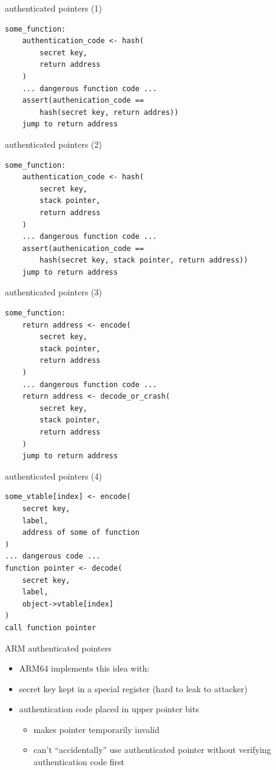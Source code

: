 \begin{frame}[fragile,label=authPtr1]{authenticated pointers (1)}
\begin{lstlisting}[language={},style=smaller]
some_function:
    authentication_code <- hash(
        secret key, 
        return address
    )
    ... dangerous function code ...
    assert(authenication_code ==
        hash(secret key, return addres))
    jump to return address
\end{lstlisting}
\end{frame}

\begin{frame}[fragile,label=authPtr2]{authenticated pointers (2)}
\begin{lstlisting}[language={},style=smaller]
some_function:
    authentication_code <- hash(
        secret key,
        stack pointer, 
        return address
    )
    ... dangerous function code ...
    assert(authenication_code ==
        hash(secret key, stack pointer, return address))
    jump to return address
\end{lstlisting}
\end{frame}


\begin{frame}[fragile,label=authPtr3]{authenticated pointers (3)}
\begin{lstlisting}[language={},style=smaller]
some_function:
    return address <- encode(
        secret key,
        stack pointer, 
        return address
    )
    ... dangerous function code ...
    return address <- decode_or_crash(
        secret key,
        stack pointer, 
        return address
    )
    jump to return address
\end{lstlisting}
\end{frame}

\begin{frame}[fragile,label=authPtr4]{authenticated pointers (4)}
\begin{lstlisting}[language={},style=smaller]
some_vtable[index] <- encode(
    secret key,
    label,
    address of some of function
)
... dangerous code ...
function pointer <- decode(
    secret key,
    label,
    object->vtable[index]
)
call function pointer
\end{lstlisting}
\end{frame}

\begin{frame}{ARM authenticated pointers}
    \begin{itemize}
    \item ARM64 implements this idea with:
    \vspace{.5cm}
    \item secret key kept in a special register (hard to leak to attacker)
    \item authentication code placed in upper pointer bits
        \begin{itemize}
        \item makes pointer temporarily invalid
        \item can't ``accidentally'' use authenticated pointer without verifying authentication code first
        \end{itemize}
    \end{itemize}
\end{frame}

